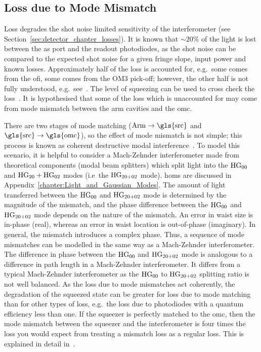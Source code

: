 \subsection{Loss due to Mode Mismatch}
\label{sec:beam_parameter_chapter_mm_losses}
Loss degrades the shot noise limited sensitivity of the interferometer (see Section~\ref{sec:detector_chapter_losses}). It is known that $\sim\!20\%$ of the light is lost between the \gls{as} port and the readout photodiodes, as the shot noise can be compared to the expected shot noise for a given fringe slope, input power and known losses. Approximately half of the loss is accounted for, e.g.~some comes from the \gls{ofi}, some comes from the OM3 pick-off; however, the other half is not fully understood, e.g.~see~\cite{LLO_optical_losses_2018}. The level of squeezing can be used to cross check the loss~\cite{Squeezing_loss_2020}. It is hypothesised that some of the loss which is unaccounted for may come from mode mismatch between the arm cavities and the \gls{omc}.
\par
There are two stages of mode matching ($\rm{Arm}\rightarrow\rm{\gls{src}}$ and $\rm{\gls{src}}\rightarrow\rm{\gls{omc}}$), so the effect of mode mismatch is not simple; this process is known as coherent destructive modal interference~\cite{McCuller2020a}. To model this scenario, it is helpful to consider a Mach-Zehnder interferometer made from theoretical components (modal beam splitters) which split light into the $\rm{HG}_{00}$ and $\rm{HG}_{20} + \rm{HG}_{02}$ modes (i.e~the $\rm{HG}_{20+02}$ mode). \glspl{hom} are discussed in Appendix~\ref{chapter:Light_and_Gaussian_Modes}. The amount of light transferred between the $\rm{HG}_{00}$ and $\rm{HG}_{20+02}$ mode is determined by the magnitude of the mismatch, and the phase difference between the $\rm{HG}_{00}$ and $\rm{HG}_{20+02}$ mode depends on the nature of the mismatch. An error in waist size is in-phase (real), whereas an error in waist location is out-of-phase (imaginary). In general, the mismatch introduces a complex phase. Thus, a sequence of mode mismatches can be modelled in the same way as a Mach-Zehnder interferometer. The difference in phase between the $\rm{HG}_{00}$ and $\rm{HG}_{20+02}$ mode is analogous to a difference in path length in a Mach-Zehnder interferometer. It differs from a typical Mach-Zehnder interferometer as the $\rm{HG}_{00}$ to $\rm{HG}_{20+02}$ splitting ratio is not well balanced. As the loss due to mode mismatches act coherently, the degradation of the squeezed state can be greater for loss due to mode matching than for other types of loss, e.g.~the loss due to photodiodes with a quantum efficiency less than one. If the squeezer is perfectly matched to the \gls{omc}, then the mode mismatch between the squeezer and the interferometer is four times the loss you would expect from treating a mismatch loss as a regular loss. This is explained in detail in~\cite{McCuller2020a,McCuller2020_dcc}.
